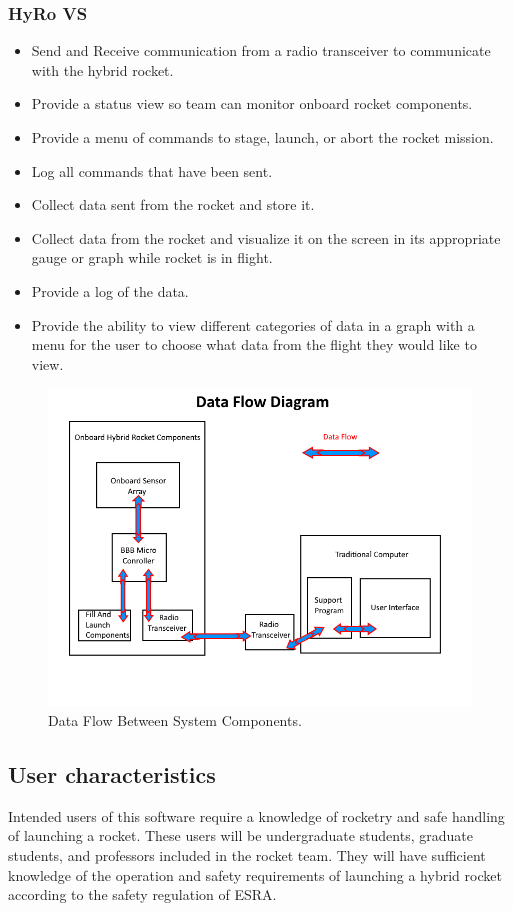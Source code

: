 \documentclass[10pt,draftclsnofoot,onecolumn,retainorgcmds]{IEEEtran}
\begin{document}
\subsubsection{HyRo VS}
\begin{itemize}
	\item Send and Receive communication from a radio transceiver to communicate with the hybrid rocket.
	\item Provide a status view so team can monitor onboard rocket components.
	\item Provide a menu of commands to stage, launch, or abort the rocket mission.
	\item Log all commands that have been sent.
	\item Collect data sent from the rocket and store it.
	\item Collect data from the rocket and visualize it on the screen in its appropriate gauge or graph while rocket is in flight.
	\item Provide a log of the data.
	\item Provide the ability to view different categories of data in a graph with a menu for the user to choose what data from the flight they would like to view.\end{itemize}

\begin{figure}[!ht]
	\caption{Data Flow Between System Components.}
	\centering
	\includegraphics[scale=.85]{RocketBlockDiagram}
\end{figure}
\FloatBarrier
\subsection{ User characteristics}
Intended users of this software require a knowledge of rocketry and safe handling of launching a rocket. These users will be undergraduate students, graduate students, and professors included in the rocket team. They will have sufficient knowledge of the operation and safety requirements of launching a hybrid rocket according to the safety regulation of ESRA.
\end{document}
